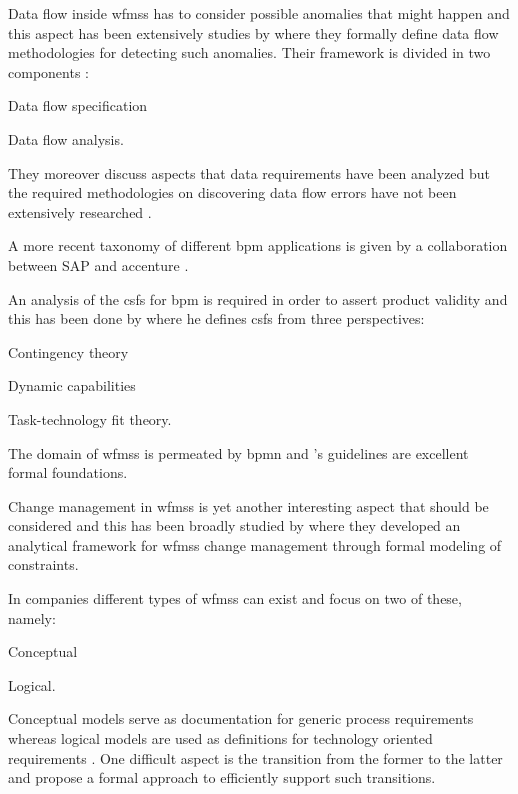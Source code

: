 Data flow inside \glspl{wfms} has to consider possible anomalies that might happen and this aspect has been extensively studies by \citet{Sun2006} where they formally define data flow methodologies for detecting such anomalies. Their framework is divided in two components \citep{Sun2006}:
\begin{enumerate*}
	\item Data flow specification
	\item Data flow analysis.
\end{enumerate*}
They moreover discuss aspects that data requirements have been analyzed but the required methodologies on discovering data flow errors have not been extensively researched \citep{Sun2006}.

A more recent taxonomy of different \gls{bpm} applications is given by a collaboration between SAP and accenture \citep{EvolvedTechnologist2009}.

An analysis of the \glspl{csf} for \gls{bpm} is required in order to assert product validity and this has been done by \citet{Trkman2010} where he defines \glspl{csf} from three perspectives:
\begin{enumerate*}
	\item Contingency theory
	\item Dynamic capabilities
	\item Task-technology fit theory.
\end{enumerate*}

The domain of \glspl{wfms} is permeated by \gls{bpmn} and \citet{Silver2011}'s guidelines are excellent formal foundations.

Change management in \glspl{wfms} is yet another interesting aspect that should be considered and this has been broadly studied by \citet{Wang2011} where they developed an analytical framework for \glspl{wfms} change management through formal modeling of constraints.

In companies different types of \glspl{wfms} can exist and \citet{Fan2012} focus on two of these, namely:
\begin{enumerate*}
	\item Conceptual
	\item Logical.
\end{enumerate*}
Conceptual models serve as documentation for generic process requirements whereas logical models are used as definitions for technology oriented requirements \citep{Fan2012}. One difficult aspect is the transition from the former to the latter and \citet{Fan2012} propose a formal approach to efficiently support such transitions.

